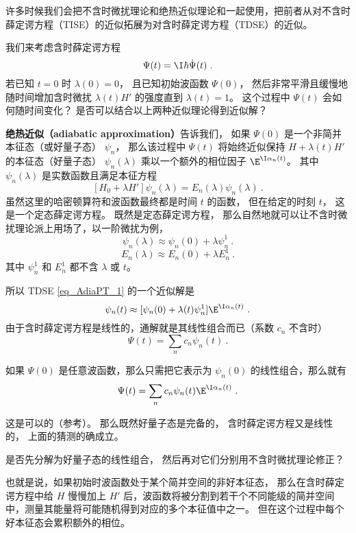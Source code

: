 

许多时候我们会把不含时微扰理论和绝热近似理论和一起使用，把前者从对不含时薛定谔方程（TISE）的近似拓展为对含时薛定谔方程（TDSE）的近似。

我们来考虑含时薛定谔方程
\begin{equation}
[H_0 + \lambda(t)H']\Psi(t) = \I\hbar\dot \Psi(t)~.
\end{equation}
若已知 $t=0$ 时 $\lambda(0) = 0$， 且已知初始波函数 $\Psi(0)$， 然后非常平滑且缓慢地随时间增加含时微扰 $\lambda(t) H'$ 的强度直到 $\lambda(t)=1$。 这个过程中 $\Psi(t)$ 会如何随时间变化？ 是否可以结合以上两种近似理论得到近似解？

\textbf{绝热近似（adiabatic approximation）}告诉我们， 如果 $\Psi(0)$ 是一个非简并本征态（或好量子态） $\psi_n$， 那么该过程中 $\Psi(t)$ 将始终近似保持 $H+\lambda(t) H'$ 的本征态（好量子态） $\psi_n(\lambda)$ 乘以一个额外的相位因子 $\E^{\I\alpha_n(t)}$。 其中 $\psi_n(\lambda)$ 是实数函数且满足本征方程
\begin{equation}\label{eq_AdiaPT_1}
[H_0 + \lambda H']\psi_n(\lambda) = E_n(\lambda)\psi_n(\lambda)~.
\end{equation}
虽然这里的哈密顿算符和波函数最终都是时间 $t$ 的函数， 但在给定的时刻 $t$， 这是一个定态薛定谔方程。 既然是定态薛定谔方程， 那么自然地就可以让不含时微扰理论派上用场了，以一阶微扰为例，
\begin{equation}
\psi_n(\lambda) \approx \psi_n(0) + \lambda\psi_n^1~.
\end{equation}
\begin{equation}
E_n(\lambda) \approx E_n(0) + \lambda E_n^1~.
\end{equation}
其中 $\psi_n^1$ 和 $E_n^1$ 都不含 $\lambda$ 或 $t$。

所以 TDSE \autoref{eq_AdiaPT_1} 的一个近似解是
\begin{equation}
\psi_n(t) \approx [\psi_n(0) + \lambda(t)\psi_n^1] \E^{\I\alpha_n(t)}~.
\end{equation}
由于含时薛定谔方程是线性的，通解就是其线性组合而已（系数 $c_n$ 不含时）
\begin{equation}
\Psi(t) = \sum_n c_n \psi_n(t)~.
\end{equation}


如果 $\Psi(0)$ 是任意波函数，那么只需把它表示为 $\psi_n(0)$ 的线性组合，那么就有
\begin{equation}
\Psi(t) = \sum_n c_n \psi_n(t) \E^{\I\alpha_n(t)}~.
\end{equation}


这是可以的（参考\cite{GriffQ}）。 那么既然好量子态是完备的， 含时薛定谔方程又是线性的， 上面的猜测的确成立。

是否先分解为好量子态的线性组合， 然后再对它们分别用不含时微扰理论修正？

也就是说，如果初始时波函数处于某个简并空间的非好本征态， 那么在含时薛定谔方程中给 $H$ 慢慢加上 $H'$ 后，波函数将被分割到若干个不同能级的简并空间中，测量其能量将可能随机得到对应的多个本征值中之一。 但在这个过程中每个好本征态会累积额外的相位。
